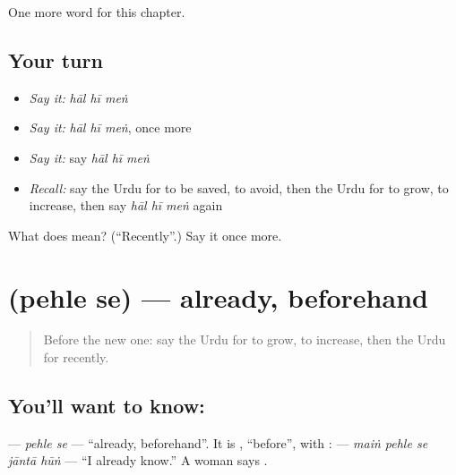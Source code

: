 \begin{grammarlens}[title={What you've built}]
One more word for this chapter.
\end{grammarlens}

\subsection*{Your turn}
\begin{itemize}
\raggedright
  \item \emph{Say it:} \emph{hāl hī meṅ}
  \item \emph{Say it:} \emph{hāl hī meṅ}, once more
  \item \emph{Say it:} say \emph{hāl hī meṅ}
  \item \emph{Recall:} say the Urdu for to be saved, to avoid, then the Urdu for to grow, to increase, then say \emph{hāl hī meṅ} again
\end{itemize}

\begin{tcolorbox}[breakable,colback=teal!4,colframe=teal!35!black,title={Before you move on}]
What does    mean? (\textquotedblleft{}Recently\textquotedblright{}.) Say it once more.
\end{tcolorbox}
\section[\texorpdfstring{\ur{پہلے} \ur{سے} (pehle se)}{پہلے سے (pehle se)}]{  (pehle se) — already, beforehand}

\label{lesson:UR-C144-pehle-se}



\begin{quote}
Before the new one: say the Urdu for to grow, to increase, then the Urdu for recently.
\end{quote}

\subsection*{You'll want to know:  }
\textbf{ } — \emph{pehle se} — \textquotedblleft{}already, beforehand\textquotedblright{}. It is \textbf{}, \textquotedblleft{}before\textquotedblright{}, with \textbf{}: \textbf{    } — \emph{maiṅ pehle se jāntā hūṅ} — \textquotedblleft{}I already know.\textquotedblright{} A woman says \textbf{}.

